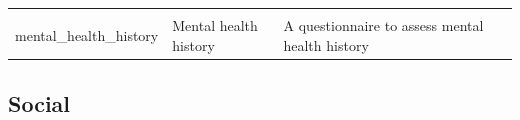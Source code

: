\documentclass[]{book}
\begin{document}
\begin{longtable}[]{@{}llll@{}}
\begin{minipage}[t]{0.18\columnwidth}
\strut
\end{minipage}\tabularnewline
\begin{minipage}[t]{0.22\columnwidth}\raggedright
mental\_health\_history\strut
\end{minipage} & \begin{minipage}[t]{0.27\columnwidth}\raggedright
Mental health history\strut
\end{minipage} & \begin{minipage}[t]{0.22\columnwidth}\raggedright
A questionnaire to assess mental health history\strut
\end{minipage} & \begin{minipage}[t]{0.18\columnwidth}\raggedright
\strut
\end{minipage}\tabularnewline
\bottomrule
\end{longtable}

\hypertarget{social-1}{%
\subsection{Social}\label{social-1}}
\end{document}
